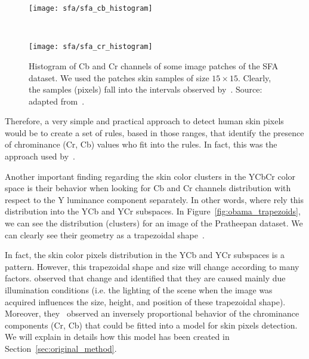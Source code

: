 \begin{figure}[!ht]
    \centering
    \begin{minipage}{0.485\textwidth}
        \texttt{[image: sfa/sfa\_cb\_histogram]}
    \end{minipage}
    ~ %
    \begin{minipage}{0.485\textwidth}
        \texttt{[image: sfa/sfa\_cr\_histogram]}
    \end{minipage}
    \caption[Histogram of Cb and Cr channels of some image patches of the SFA dataset]{Histogram of Cb and Cr channels of some image patches of the SFA dataset. We used the patches skin samples of size $15 \times 15$. Clearly, the samples (pixels) fall into the intervals observed by~\citet{chai:99}. Source: adapted from~\citet{chai:99}.}
    \label{fig:dataset_sfa_ycbcr_hist}
\end{figure}

Therefore, a very simple and practical approach to detect human skin pixels would be to create a set of rules, based in those ranges, that identify the presence of chrominance (Cr, Cb) values who fit into the rules. In fact, this was the approach used by~\citet{chai:99}.

Another important finding regarding the skin color clusters in the YCbCr color space is their behavior when looking for Cb and Cr channels distribution with respect to the Y luminance component separately. In other words, where rely this distribution into the YCb and YCr subspaces. In Figure~\ref{fig:obama_trapezoids}, we can see the distribution (clusters) for an image of the Pratheepan dataset. We can clearly see their geometry as a trapezoidal shape~\citep{hsu:02}.

In fact, the skin color pixels distribution in the YCb and YCr subspaces is a pattern. However, this trapezoidal shape and size will change according to many factors. \citet{brancati:17} observed that change and identified that they are caused mainly due illumination conditions (i.e. the lighting of the scene when the image was acquired influences the size, height, and position of these trapezoidal shape). Moreover, they~\citep{brancati:17} observed an inversely proportional behavior of the chrominance components (Cr, Cb) that could be fitted into a model for skin pixels detection. We will explain in details how this model has been created in Section~\ref{sec:original_method}.

